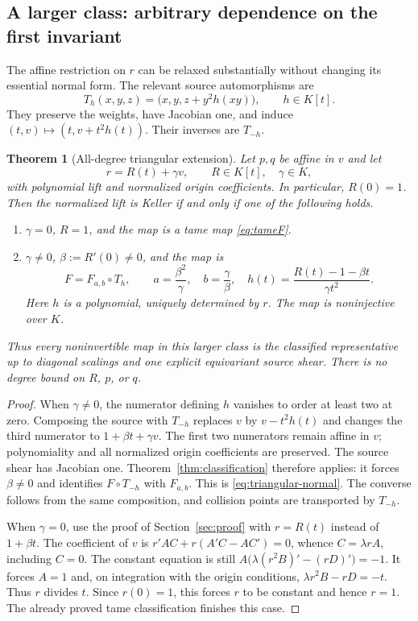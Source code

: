 \documentclass[11pt,a4paper]{article}
\numberwithin{equation}{section}
\newtheorem{theorem}{Theorem}[section]
\theoremstyle{definition}
\theoremstyle{remark}
\begin{document}
\subsection{A larger class: arbitrary dependence on the first invariant}
\label{sec:triangular}

The affine restriction on $r$ can be relaxed substantially without changing
its essential normal form. The relevant source automorphisms are
\begin{equation}\label{eq:source-shear}
T_h(x,y,z)=\bigl(x,y,z+y^2h(xy)\bigr),\qquad h\in K[t].
\end{equation}
They preserve the weights, have Jacobian one, and induce
$(t,v)\mapsto(t,v+t^2h(t))$. Their inverses are $T_{-h}$.

\begin{theorem}[All-degree triangular extension]\label{thm:triangular}
Let $p,q$ be affine in $v$ and let
\[
r=R(t)+\gamma v,\qquad R\in K[t],\quad \gamma\in K,
\]
with polynomial lift and normalized origin coefficients. In particular,
$R(0)=1$. Then the normalized lift is Keller if and only if one of the
following holds.
\begin{enumerate}[label=\textup{(\roman*)}]
\item $\gamma=0$, $R=1$, and the map is a tame map
\eqref{eq:tameF}.
\item $\gamma\ne0$, $\beta:=R'(0)\ne0$, and the map is
\begin{equation}\label{eq:triangular-normal}
F=F_{a,b}\circ T_h,\qquad
 a=\frac{\beta^2}{\gamma},\quad b=\frac{\gamma}{\beta},\quad
 h(t)=\frac{R(t)-1-\beta t}{\gamma t^2}.
\end{equation}
Here $h$ is a polynomial, uniquely determined by $r$. The map is
noninjective over $K$.
\end{enumerate}
Thus every noninvertible map in this larger class is the classified
representative up to diagonal scalings and one explicit equivariant source
shear. There is no degree bound on $R$, $p$, or $q$.
\end{theorem}
\begin{proof}
When $\gamma\ne0$, the numerator defining $h$ vanishes to order at least
two at zero. Composing the source with $T_{-h}$ replaces $v$ by
$v-t^2h(t)$ and changes the third numerator to $1+\beta t+\gamma v$.
The first two numerators remain affine in $v$; polynomiality and all
normalized origin coefficients are preserved. The source shear has
Jacobian one. Theorem~\ref{thm:classification} therefore applies: it
forces $\beta\ne0$ and identifies $F\circ T_{-h}$ with $F_{a,b}$.
This is \eqref{eq:triangular-normal}. The converse follows from the same
composition, and collision points are transported by $T_{-h}$.

When $\gamma=0$, use the proof of Section~\ref{sec:proof} with
$r=R(t)$ instead of $1+\beta t$. The coefficient of $v$ is
$r'AC+r(A'C-AC')=0$, whence $C=\lambda rA$, including $C=0$.
The constant equation is still
$A\bigl(\lambda(r^2B)'-(rD)'\bigr)=-1$.
It forces $A=1$ and, on integration with the origin conditions,
$\lambda r^2B-rD=-t$. Thus $r$ divides $t$. Since $r(0)=1$, this
forces $r$ to be constant and hence $r=1$. The already proved tame
classification finishes this case.
\end{proof}
\end{document}

